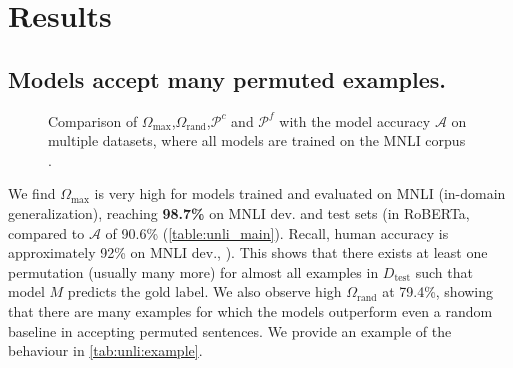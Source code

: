 \documentclass[letterpaper, 12pt]{report}
\begin{document}
\section{Results}
\label{sec:unli_results}

\subsection{Models accept many permuted examples.}
\label{sec:unli_results_accept}

\begin{figure}[ht]
    \centering
    \caption{Comparison of $\Omega_{\text{max}}$,$\Omega_{\text{rand}}$,$\mathcal{P}^c$ and $\mathcal{P}^f$ with the model accuracy $\mathcal{A}$ on multiple datasets, where all models are trained on the MNLI corpus \cite{williams-etal-2018-broad}.}
    \label{fig:comb_plot}
\end{figure}

We find $\Omega_{\text{max}}$ is very high for models trained and evaluated on MNLI (in-domain generalization), reaching \textbf{98.7\%} on MNLI dev. and test sets (in RoBERTa, compared to $\mathcal{A}$ of 90.6\% (\autoref{table:unli_main}). Recall, human accuracy is approximately 92\% on MNLI dev.,  \citealt{nangia-bowman-2019-human}). This shows that there exists at least one permutation (usually many more) for almost all examples in $D_{\text{test}}$ such that model $M$ predicts the gold label. We also observe high $\Omega_{\text{rand}}$ at 79.4\%, showing that there are many examples for which the models outperform even a random baseline in accepting permuted sentences. We provide an example of the behaviour in \autoref{tab:unli:example}.
\end{document}
